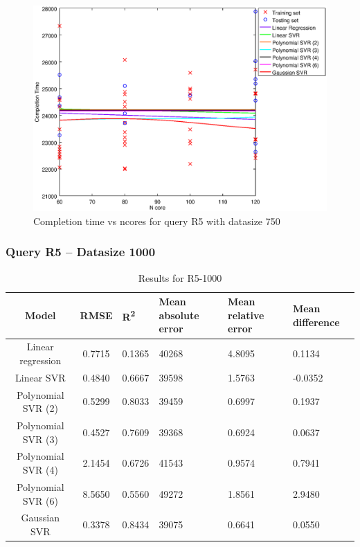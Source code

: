 \documentclass[a4paper,11pt]{article}
\begin{document}
\begin {figure}[hbtp]
\centering
\includegraphics[width=\textwidth]{output/R5_750_LINEAR_NCORE/plot_R5_750.eps}
\caption{Completion time vs ncores for query R5 with datasize 750}
\label{fig:all_linear_R5_750}
\end {figure}

\newpage
\subsubsection{Query R5 -- Datasize 1000}
\begin{table}[H]
	\centering
	\begin{adjustbox}{center}
		\begin{tabular}{c | c M{1.2cm} M{2.5cm} M{2.5cm} M{1.8cm}}
			Model & RMSE & R\textsuperscript{2} & Mean absolute error & Mean relative error & Mean difference \tabularnewline
			\hline
			Linear regression & 0.7715 & 0.1365 &  40268 & 4.8095 & 0.1134 \\
			Linear SVR & 0.4840 & 0.6667 &  39598 & 1.5763 & -0.0352 \\
			Polynomial SVR (2) & 0.5299 & 0.8033 &  39459 & 0.6997 & 0.1937 \\
			Polynomial SVR (3) & 0.4527 & 0.7609 &  39368 & 0.6924 & 0.0637 \\
			Polynomial SVR (4) & 2.1454 & 0.6726 &  41543 & 0.9574 & 0.7941 \\
			Polynomial SVR (6) & 8.5650 & 0.5560 &  49272 & 1.8561 & 2.9480 \\
			Gaussian SVR & 0.3378 & 0.8434 &  39075 & 0.6641 & 0.0550 \\
		\end{tabular}
	\end{adjustbox}
	\\
	\caption{Results for R5-1000}
	\label{fig:all_linear_R5_1000}
\end{table}
\end{document}
